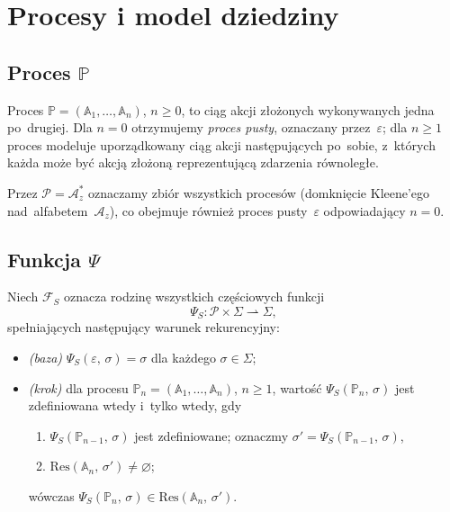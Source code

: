 \documentclass[11pt,a4paper]{article}
\theoremstyle{definition}
\begin{document}
\section{Procesy i model dziedziny}
\label{sec:procesy}

\subsection{Proces \texorpdfstring{$\mathbb{P}$}{P}}
\label{sec:proces}

Proces $\mathbb{P} = (\mathbb{A}_1, \ldots, \mathbb{A}_n)$, $n \geq 0$, to ciąg akcji złożonych wykonywanych jedna po~drugiej. Dla $n = 0$ otrzymujemy \emph{proces pusty}, oznaczany przez~$\varepsilon$; dla $n \geq 1$ proces modeluje uporządkowany ciąg akcji następujących po~sobie, z~których każda może być akcją złożoną reprezentującą zdarzenia równoległe.

Przez $\mathcal{P} = \mathcal{A}_z^*$ oznaczamy zbiór wszystkich procesów (domknięcie Kleene'ego nad~alfabetem~$\mathcal{A}_z$), co obejmuje również proces pusty~$\varepsilon$ odpowiadający $n=0$.

\subsection{Funkcja \texorpdfstring{$\Psi$}{Psi}}

Niech $\mathcal{F}_S$ oznacza rodzinę wszystkich częściowych funkcji
\[
  \Psi_S : \mathcal{P} \times \Sigma \rightharpoonup \Sigma,
\]
spełniających następujący warunek rekurencyjny:
\begin{itemize}
  \item \emph{(baza)} $\Psi_S(\varepsilon,\,\sigma) = \sigma$ dla każdego $\sigma \in \Sigma$;
  \item \emph{(krok)} dla procesu $\mathbb{P}_n = (\mathbb{A}_1,\ldots,\mathbb{A}_n)$, $n \geq 1$, wartość
        $\Psi_S(\mathbb{P}_n,\,\sigma)$ jest zdefiniowana wtedy i~tylko wtedy, gdy
        \begin{enumerate}
          \item $\Psi_S(\mathbb{P}_{n-1},\,\sigma)$ jest zdefiniowane; oznaczmy
                $\sigma' = \Psi_S(\mathbb{P}_{n-1},\,\sigma)$,
          \item $\mathrm{Res}(\mathbb{A}_n,\,\sigma') \neq \varnothing$;
        \end{enumerate}
        wówczas $\Psi_S(\mathbb{P}_n,\,\sigma) \in \mathrm{Res}(\mathbb{A}_n,\,\sigma')$.
\end{itemize}
\end{document}
